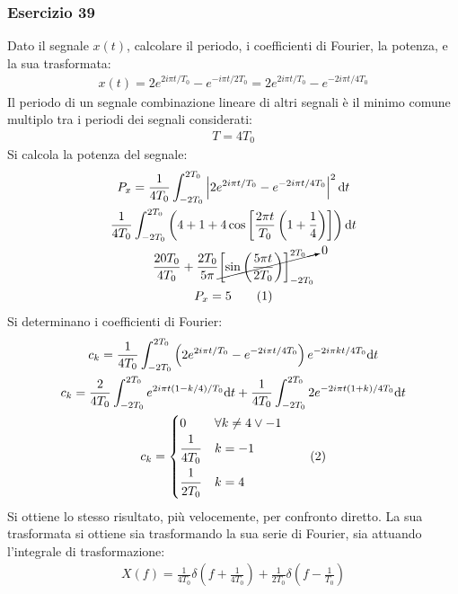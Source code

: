 \documentclass{article}
\newcommand{\df}{\mathrm{d}}
\newcommand{\tageq}{\tag{\stepcounter{equation}\theequation}}
\begin{document}
\subsubsection*{Esercizio 39}

Dato il segnale $x(t)$, calcolare il periodo, i coefficienti di Fourier, la potenza, e la sua trasformata:
\begin{gather*}
    x(t)=2e^{2i\pi t/T_0}-e^{-i\pi t/2T_0}=2e^{2i\pi t/T_0}-e^{-2i\pi t/4T_0}
\end{gather*}
Il periodo di un segnale combinazione lineare di altri segnali è il minimo comune multiplo tra i periodi dei segnali considerati:
\begin{gather}
    T=4T_0
\end{gather}
Si calcola la potenza del segnale:
\begin{gather*}
    P_x=\displaystyle\frac{1}{4T_0}\int_{-2T_0}^{2T_0}\left|2e^{2i\pi t/T_0}-e^{-2i\pi t/4T_0}\right|^2\df t\\
    \displaystyle\frac{1}{4T_0}\int_{-2T_0}^{2T_0}\left(4+1+4\cos\left[\frac{2\pi t}{T_0}\left(1+\frac{1}{4}\right)\right]\right)\df t\\
    \displaystyle\frac{20T_0}{4T_0}+\frac{2T_0}{5\pi }\cancelto{0}{\left[\sin\left(\frac{5\pi t}{2T_0}\right)\right]_{-2T_0}^{2T_0}}\\
    P_x=5\tageq
\end{gather*}
Si determinano i coefficienti di Fourier:
\begin{gather*}
    c_k=\displaystyle\frac{1}{4T_0}\int_{-2T_0}^{2T_0}\left(2e^{2i\pi t/T_0}-e^{-2i\pi t/4T_0}\right)e^{-2i\pi kt/4T_0}\df t\\
    c_k=\displaystyle\frac{2}{4T_0}\int_{-2T_0}^{2T_0}e^{2i\pi t(1-k/4)/T_0}\df t+\frac{1}{4T_0}\int_{-2T_0}^{2T_0}2e^{-2i\pi t(1+k)/4T_0}\df t\\
    c_k=\begin{cases}
        0 &\forall k\neq4\lor-1\\
        \displaystyle\frac{\strut 1}{\strut 4T_0}& k=-1\\
        \displaystyle\frac{\strut 1}{\strut 2T_0}&k=4
    \end{cases}\tageq
\end{gather*}
Si ottiene lo stesso risultato, più velocemente, per confronto diretto. La sua trasformata si ottiene sia trasformando la sua serie di Fourier, sia attuando l'integrale 
di trasformazione:
\begin{gather}
    X(f)=\displaystyle\frac{1}{4T_0}\delta\left(f+\frac{1}{4T_0}\right)+\frac{1}{2T_0}\delta\left(f-\frac{1}{T_0}\right)
\end{gather}
\end{document}
